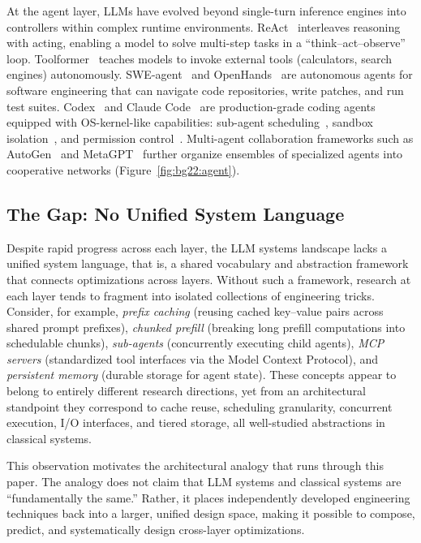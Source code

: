 At the agent layer, LLMs have evolved beyond single-turn inference engines into controllers within complex runtime environments.
ReAct~\cite{yao2023react} interleaves reasoning with acting, enabling a model to solve multi-step tasks in a ``think--act--observe'' loop.
Toolformer~\cite{schick2023toolformer} teaches models to invoke external tools (calculators, search engines) autonomously.
SWE-agent~\cite{sweagent2024} and OpenHands~\cite{openhands_paper_2025} are autonomous agents for software engineering that can navigate code repositories, write patches, and run test suites.
Codex~\cite{openai_codex_overview_2026} and Claude Code~\cite{anthropic_claudecode_overview_2026} are production-grade coding agents equipped with OS-kernel-like capabilities: sub-agent scheduling~\cite{openai_codex_overview_2026,anthropic_claudecode_subagents_2026}, sandbox isolation~\cite{openai_codex_sandbox_2026,anthropic_claudecode_sandbox_2026}, and permission control~\cite{openai_codex_approvals_2026,anthropic_claudecode_security_2026}.
Multi-agent collaboration frameworks such as AutoGen~\cite{wu2023autogen} and MetaGPT~\cite{metagpt2023} further organize ensembles of specialized agents into cooperative networks (Figure~\ref{fig:bg22:agent}).


\subsection{The Gap: No Unified System Language}

Despite rapid progress across each layer, the LLM systems landscape lacks a unified system language, that is, a shared vocabulary and abstraction framework that connects optimizations across layers.
Without such a framework, research at each layer tends to fragment into isolated collections of engineering tricks.
Consider, for example, \emph{prefix caching} (reusing cached key--value pairs across shared prompt prefixes), \emph{chunked prefill} (breaking long prefill computations into schedulable chunks), \emph{sub-agents} (concurrently executing child agents), \emph{MCP servers} (standardized tool interfaces via the Model Context Protocol), and \emph{persistent memory} (durable storage for agent state).
These concepts appear to belong to entirely different research directions, yet from an architectural standpoint they correspond to cache reuse, scheduling granularity, concurrent execution, I/O interfaces, and tiered storage, all well-studied abstractions in classical systems.

This observation motivates the architectural analogy that runs through this paper.
The analogy does not claim that LLM systems and classical systems are ``fundamentally the same.''
Rather, it places independently developed engineering techniques back into a larger, unified design space, making it possible to compose, predict, and systematically design cross-layer optimizations.


